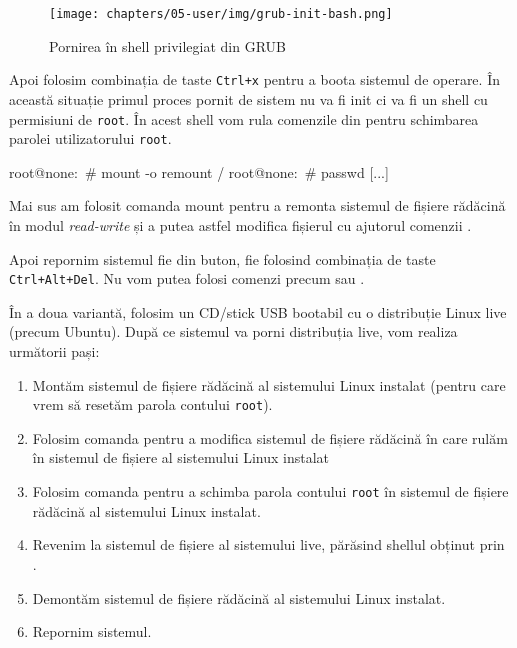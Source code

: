 \begin{figure}[!htbp]
  \centering
  \texttt{[image: chapters/05-user/img/grub-init-bash.png]}
  \caption{Pornirea în shell privilegiat din GRUB}
  \label{fig:user:grub-init-bash}
\end{figure}

Apoi folosim combinația de taste \texttt{Ctrl+x} pentru a boota sistemul de operare. În
această situație primul proces pornit de sistem nu va fi init ci va fi un shell
cu permisiuni de \texttt{root}. În acest shell vom rula comenzile din  pentru
schimbarea parolei utilizatorului \texttt{root}.

\begin{screen}[caption={Schimbarea parolei contului root în shellul privilegiat},label={lst:user:change-root-pw}]
root@none:~# mount -o remount /
root@none:~# passwd
[...]
\end{screen}

Mai sus am folosit comanda mount pentru a remonta sistemul de fișiere rădăcină
în modul \textit{read-write} și a putea astfel modifica fișierul  cu ajutorul
comenzii .

Apoi repornim sistemul fie din buton, fie folosind combinația de taste
\texttt{Ctrl+Alt+Del}. Nu vom putea folosi comenzi precum  sau .

În a doua variantă, folosim un CD/stick USB bootabil cu o distribuție Linux live
(precum Ubuntu). După ce sistemul va porni distribuția live, vom realiza
următorii pași:

\begin{enumerate}
  \item Montăm sistemul de fișiere rădăcină al sistemului Linux instalat
		(pentru care vrem să resetăm parola contului \texttt{root}).
  \item Folosim comanda  pentru a modifica sistemul de fișiere
		rădăcină în care rulăm în sistemul de fișiere al sistemului
		Linux instalat
  \item Folosim comanda  pentru a schimba parola contului \texttt{root} în
		sistemul de fișiere rădăcină al sistemului Linux instalat.
  \item Revenim la sistemul de fișiere al sistemului live, părăsind
        shellul obținut prin .
  \item Demontăm sistemul de fișiere rădăcină al sistemului Linux
		instalat.
  \item Repornim sistemul.
\end{enumerate}

